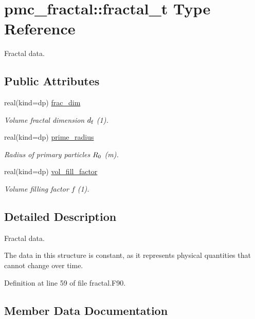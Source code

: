 \hypertarget{structpmc__fractal_1_1fractal__t}{}\section{pmc\+\_\+fractal\+:\+:fractal\+\_\+t Type Reference}
\label{structpmc__fractal_1_1fractal__t}


Fractal data.  


\subsection*{Public Attributes}
\begin{DoxyCompactItemize}
\item 
real(kind=dp) \mbox{\hyperlink{structpmc__fractal_1_1fractal__t_ab0cd11c6c43a635533aaf0ae49396cb9}{frac\+\_\+dim}}
\begin{DoxyCompactList}\small\item\em Volume fractal dimension $d_{\rm f}$ (1). \end{DoxyCompactList}\item 
real(kind=dp) \mbox{\hyperlink{structpmc__fractal_1_1fractal__t_a8695004688e430cd15f1a3fc698081b8}{prime\+\_\+radius}}
\begin{DoxyCompactList}\small\item\em Radius of primary particles $R_{\rm 0}$ (m). \end{DoxyCompactList}\item 
real(kind=dp) \mbox{\hyperlink{structpmc__fractal_1_1fractal__t_ae749b3efb3fbc29b095bbdd485c311e7}{vol\+\_\+fill\+\_\+factor}}
\begin{DoxyCompactList}\small\item\em Volume filling factor $f$ (1). \end{DoxyCompactList}\end{DoxyCompactItemize}


\subsection{Detailed Description}
Fractal data. 

The data in this structure is constant, as it represents physical quantities that cannot change over time. 

Definition at line 59 of file fractal.\+F90.



\subsection{Member Data Documentation}
\mbox{\label{structpmc__fractal_1_1fractal__t_ab0cd11c6c43a635533aaf0ae49396cb9}} 
